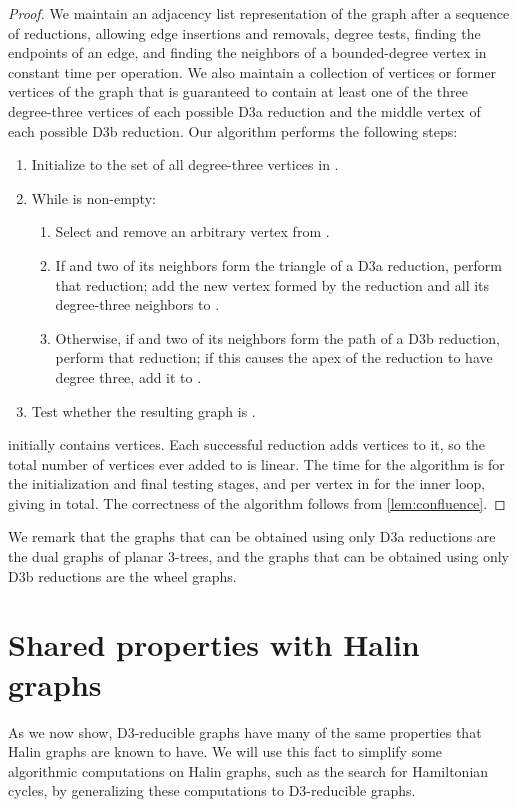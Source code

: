 \documentclass{article}
\begin{document}
\begin{proof}
We maintain an adjacency list representation of the graph  after a sequence of reductions, allowing edge insertions and removals, degree tests, finding the endpoints of an edge, and finding the neighbors of a bounded-degree vertex in constant time per operation. We also maintain a collection  of vertices or former vertices of the graph that is guaranteed to contain at least one of the three degree-three vertices of each possible D3a reduction and the middle vertex of each possible D3b reduction. Our algorithm performs the following steps:
\begin{enumerate}
\item Initialize  to the set of all degree-three vertices in .
\item While  is non-empty:
\begin{enumerate}
\item Select and remove an arbitrary vertex  from .
\item If  and two of its neighbors form the triangle of a D3a reduction, perform that reduction; add the new vertex formed by the reduction and all its degree-three neighbors to .
\item Otherwise, if  and two of its neighbors form the path of a D3b reduction, perform that reduction; if this causes the apex of the reduction to have degree three, add it to .
\end{enumerate}
\item Test whether the resulting graph is .
\end{enumerate}
 initially contains  vertices. Each successful reduction adds  vertices to it, so the total number of vertices ever added to  is linear. The time for the algorithm is  for the initialization and final testing stages, and  per vertex in  for the inner loop, giving  in total. The correctness of the algorithm follows from \autoref{lem:confluence}.
\end{proof}

We remark that the graphs that can be obtained using only D3a reductions are the dual graphs of planar 3-trees, and the graphs that can be obtained using only D3b reductions are the wheel graphs.

\section{Shared properties with Halin graphs}

As we now show, D3-reducible graphs have many of the same properties that Halin graphs are known to have. We will use this fact to simplify some algorithmic computations on Halin graphs, such as the search for Hamiltonian cycles, by generalizing these computations to D3-reducible graphs.
\end{document}
